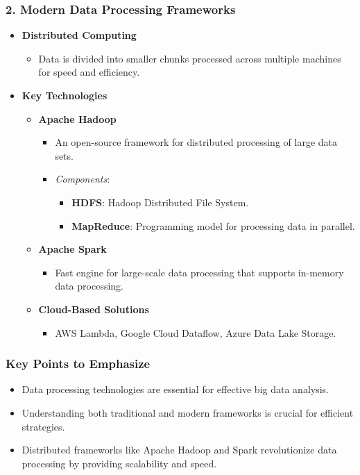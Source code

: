 \documentclass[aspectratio=169]{beamer}
\begin{document}
\begin{frame}[fragile]
    \frametitle{2. Modern Data Processing Frameworks}
    \begin{itemize}
        \item \textbf{Distributed Computing}
            \begin{itemize}
                \item Data is divided into smaller chunks processed across multiple machines for speed and efficiency.
            \end{itemize}
        \item \textbf{Key Technologies}
            \begin{itemize}
                \item \textbf{Apache Hadoop}
                    \begin{itemize}
                        \item An open-source framework for distributed processing of large data sets.
                        \item \textit{Components}:
                        \begin{itemize}
                            \item \textbf{HDFS}: Hadoop Distributed File System.
                            \item \textbf{MapReduce}: Programming model for processing data in parallel.
                        \end{itemize}
                    \end{itemize}
                \item \textbf{Apache Spark}
                    \begin{itemize}
                        \item Fast engine for large-scale data processing that supports in-memory data processing.
                    \end{itemize}
                \item \textbf{Cloud-Based Solutions}
                    \begin{itemize}
                        \item AWS Lambda, Google Cloud Dataflow, Azure Data Lake Storage.
                    \end{itemize}
            \end{itemize}
    \end{itemize}
\end{frame}

\begin{frame}[fragile]
    \frametitle{Key Points to Emphasize}
    \begin{itemize}
        \item Data processing technologies are essential for effective big data analysis.
        \item Understanding both traditional and modern frameworks is crucial for efficient strategies.
        \item Distributed frameworks like Apache Hadoop and Spark revolutionize data processing by providing scalability and speed.
    \end{itemize}
\end{frame}
\end{document}

